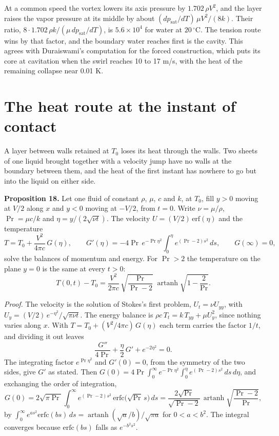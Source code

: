 At a common speed the vortex lowers its axis pressure by $1.702\,\rho V^2$, and the layer raises the
vapor pressure at its middle by about $(dp_{\mathrm{sat}}/dT)\,\mu V^2/(8k)$. Their ratio,
$8\cdot 1.702\,\rho k/(\mu\,dp_{\mathrm{sat}}/dT)$, is $5.6\times10^4$ for water at $20\,^\circ$C.
The tension route wins by that factor, and the boundary water reaches first is the cavity. This
agrees with Duraiswami's computation for the forced construction, which puts its core at
cavitation when the swirl reaches 10 to 17 m/s, with the heat of the remaining collapse near
0.01 K.

\section{The heat route at the instant of contact}

A layer between walls retained at $T_0$ loses its heat through the walls. Two sheets of one liquid
brought together with a velocity jump have no walls at the boundary between them, and the heat of
the first instant has nowhere to go but into the liquid on either side.

\textbf{Proposition 18.} Let one fluid of constant $\rho$, $\mu$, $c$ and $k$, at $T_0$, fill
$y > 0$ moving at $V/2$ along $x$ and $y < 0$ moving at $-V/2$, from $t = 0$. Write
$\nu = \mu/\rho$, $\Pr = \mu c/k$ and $\eta = y/(2\sqrt{\nu t})$. The velocity
$U = (V/2)\,\mathrm{erf}(\eta)$ and the temperature
\[
T = T_0 + \frac{V^2}{4\pi c}\,G(\eta), \qquad
G'(\eta) = -4\Pr\,e^{-\Pr\eta^2}\int_0^\eta e^{(\Pr-2)s^2}\,ds, \qquad G(\infty) = 0,
\]
solve the balances of momentum and energy. For $\Pr > 2$ the temperature on the plane $y = 0$ is
the same at every $t > 0$:
\[
T(0,t) - T_0 = \frac{V^2}{2\pi c}\,\sqrt{\frac{\Pr}{\Pr - 2}}\;
\operatorname{artanh}\sqrt{1 - \frac{2}{\Pr}} .
\]

\emph{Proof.} The velocity is the solution of Stokes's first problem, $U_t = \nu U_{yy}$, with
$U_y = (V/2)\,e^{-\eta^2}/\sqrt{\pi\nu t}$. The energy balance is
$\rho c\,T_t = k\,T_{yy} + \mu U_y^2$, since nothing varies along $x$. With
$T = T_0 + (V^2/4\pi c)\,G(\eta)$ each term carries the factor $1/t$, and dividing it out leaves
\[
\frac{G''}{4\Pr} + \frac{\eta}{2}\,G' + e^{-2\eta^2} = 0 .
\]
The integrating factor $e^{\Pr\eta^2}$ and $G'(0) = 0$, from the symmetry of the two sides, give
$G'$ as stated. Then
$G(0) = 4\Pr\int_0^\infty e^{-\Pr\eta^2}\int_0^\eta e^{(\Pr-2)s^2}\,ds\,d\eta$, and exchanging the
order of integration,
\[
G(0) = 2\sqrt{\pi\Pr}\int_0^\infty e^{(\Pr-2)s^2}\,\mathrm{erfc}\big(\sqrt{\Pr}\,s\big)\,ds
= \frac{2\sqrt{\Pr}}{\sqrt{\Pr - 2}}\,\operatorname{artanh}\sqrt{\frac{\Pr - 2}{\Pr}} ,
\]
by $\int_0^\infty e^{a s^2}\mathrm{erfc}(bs)\,ds = \operatorname{artanh}(\sqrt a/b)/\sqrt{\pi a}$
for $0 < a < b^2$. The integral converges because $\mathrm{erfc}(bs)$ falls as $e^{-b^2s^2}$.
\hfill\qedsymbol

